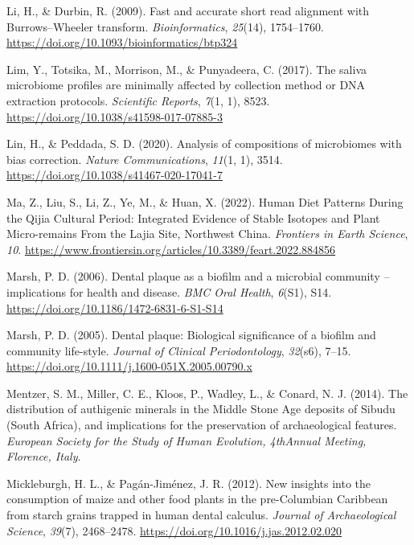 \documentclass[
]{article}
\newlength{\cslhangindent}
\newlength{\cslentryspacingunit} %
\newenvironment{CSLReferences}[2] %
 {%
  \setlength{\parindent}{0pt}
  \ifodd #1
  \let\oldpar\par
  \def\par{\hangindent=\cslhangindent\oldpar}
  \fi
  \setlength{\parskip}{#2\cslentryspacingunit}
 }%
 {}
\begin{document}
\begin{CSLReferences}{1}{0}
\leavevmode{}%
Li, H., \& Durbin, R. (2009). Fast and accurate short read alignment
with {Burrows}--{Wheeler} transform. \emph{Bioinformatics},
\emph{25}(14), 1754--1760.
\url{https://doi.org/10.1093/bioinformatics/btp324}

\leavevmode{}%
Lim, Y., Totsika, M., Morrison, M., \& Punyadeera, C. (2017). The saliva
microbiome profiles are minimally affected by collection method or {DNA}
extraction protocols. \emph{Scientific Reports}, \emph{7}(1, 1), 8523.
\url{https://doi.org/10.1038/s41598-017-07885-3}

\leavevmode{}%
Lin, H., \& Peddada, S. D. (2020). Analysis of compositions of
microbiomes with bias correction. \emph{Nature Communications},
\emph{11}(1, 1), 3514. \url{https://doi.org/10.1038/s41467-020-17041-7}

\leavevmode{}%
Ma, Z., Liu, S., Li, Z., Ye, M., \& Huan, X. (2022). Human {Diet
Patterns During} the {Qijia Cultural Period}: {Integrated Evidence} of
{Stable Isotopes} and {Plant Micro-remains From} the {Lajia Site},
{Northwest China}. \emph{Frontiers in Earth Science}, \emph{10}.
\url{https://www.frontiersin.org/articles/10.3389/feart.2022.884856}

\leavevmode{}%
Marsh, P. D. (2006). Dental plaque as a biofilm and a microbial
community -- implications for health and disease. \emph{BMC Oral
Health}, \emph{6}(S1), S14.
\url{https://doi.org/10.1186/1472-6831-6-S1-S14}

\leavevmode{}%
Marsh, P. D. (2005). Dental plaque: Biological significance of a biofilm
and community life-style. \emph{Journal of Clinical Periodontology},
\emph{32}(s6), 7--15.
\url{https://doi.org/10.1111/j.1600-051X.2005.00790.x}

\leavevmode{}%
Mentzer, S. M., Miller, C. E., Kloos, P., Wadley, L., \& Conard, N. J.
(2014). The distribution of authigenic minerals in the {Middle Stone
Age} deposits of {Sibudu} ({South Africa}), and implications for the
preservation of archaeological features. \emph{European Society for the
Study of Human Evolution, {4thAnnual} Meeting, Florence, Italy}.

\leavevmode{}%
Mickleburgh, H. L., \& Pagán-Jiménez, J. R. (2012). New insights into
the consumption of maize and other food plants in the pre-{Columbian
Caribbean} from starch grains trapped in human dental calculus.
\emph{Journal of Archaeological Science}, \emph{39}(7), 2468--2478.
\url{https://doi.org/10.1016/j.jas.2012.02.020}


\end{CSLReferences}
\end{document}
